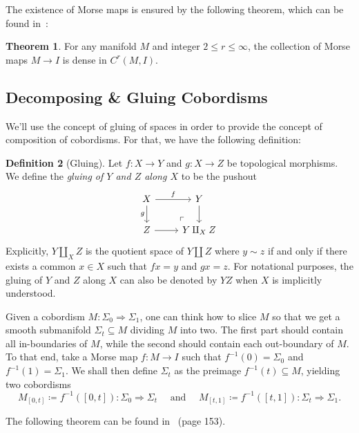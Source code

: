 \documentclass[11pt, reqno]{amsart}
\theoremstyle{definition}
\newtheorem{theorem}{Theorem}[section]
\newtheorem{definition}[theorem]{Definition}
\renewcommand{\leq}{\leqslant}
\newcommand{\disj}{\amalg}     %
\newcommand{\nat}{\Rightarrow}
\begin{document}
The existence of Morse maps is ensured by the following theorem, which can be
found in~\cite{hirsch}:

\begin{theorem}\label{thm:morse-maps-are-dense}
For any manifold \(M\) and integer \(2 \leq r \leq \infty\), the collection of
Morse maps \(M \to I\) is dense in \(C^r(M, I)\).
\end{theorem}

\subsection{Decomposing \& Gluing Cobordisms}

We'll use the concept of gluing of spaces in order to provide the concept of
composition of cobordisms. For that, we have the following definition:

\begin{definition}[Gluing]\label{def:gluing-topological-spaces}
Let \(f: X \to Y\) and \(g: X \to Z\) be topological morphisms. We define the
\emph{gluing of \(Y\) and \(Z\) along \(X\)} to be the pushout
\[
\begin{tikzcd}
X \ar[d, "g"']
\ar[r, "f"]
\ar[rd, "\ulcorner", phantom, very near end]
&Y \ar[d] \\
Z \ar[r]
&Y \disj_X Z
\end{tikzcd}
\]
Explicitly, \(Y \disj_X Z\) is the quotient space of \(Y \disj Z\) where
\(y \sim z\) if and only if there exists a common \(x \in X\) such that
\(f x = y\) and \(g x = z\). For notational purposes, the gluing of \(Y\) and
\(Z\) along \(X\) can also be denoted by \(Y Z\) when \(X\) is implicitly
understood.
\end{definition}

Given a cobordism \(M: \Sigma_0 \nat \Sigma_1\), one can think how to slice
\(M\) so that we get a smooth submanifold \(\Sigma_t \subseteq M\) dividing
\(M\) into two. The first part should contain all in-boundaries of \(M\), while
the second should contain each out-boundary of \(M\). To that end, take a Morse
map \(f: M \to I\) such that \(f^{-1}(0) = \Sigma_0\) and
\(f^{-1}(1) = \Sigma_1\). We shall then define \(\Sigma_t\) as the preimage
\(f^{-1}(t) \subseteq M\), yielding two cobordisms
\[
M_{[0, t]} \coloneq f^{-1}([0, t]): \Sigma_0 \Longrightarrow \Sigma_t
\quad \text{ and } \quad
M_{[t, 1]} \coloneq f^{-1}([t, 1]): \Sigma_t \Longrightarrow \Sigma_1.
\]

The following theorem can be found in~\cite{hirsch} (page 153).
\end{document}
